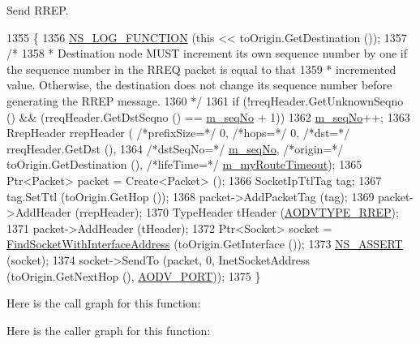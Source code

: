 Send R\+R\+EP. 


\begin{DoxyCode}
1355 \{
1356   \hyperlink{log-macros-disabled_8h_a90b90d5bad1f39cb1b64923ea94c0761}{NS\_LOG\_FUNCTION} (\textcolor{keyword}{this} << toOrigin.GetDestination ());
1357   \textcolor{comment}{/*}
1358 \textcolor{comment}{   * Destination node MUST increment its own sequence number by one if the sequence number in the RREQ
       packet is equal to that}
1359 \textcolor{comment}{   * incremented value. Otherwise, the destination does not change its sequence number before generating
       the  RREP message.}
1360 \textcolor{comment}{   */}
1361   \textcolor{keywordflow}{if} (!rreqHeader.GetUnknownSeqno () && (rreqHeader.GetDstSeqno () == \hyperlink{classns3_1_1aodv_1_1RoutingProtocol_abf5ef6b30d0ccf20b9b5ecf7918f67b2}{m\_seqNo} + 1))
1362     \hyperlink{classns3_1_1aodv_1_1RoutingProtocol_abf5ef6b30d0ccf20b9b5ecf7918f67b2}{m\_seqNo}++;
1363   RrepHeader rrepHeader ( \textcolor{comment}{/*prefixSize=*/} 0, \textcolor{comment}{/*hops=*/} 0, \textcolor{comment}{/*dst=*/} rreqHeader.GetDst (),
1364                                           \textcolor{comment}{/*dstSeqNo=*/} \hyperlink{classns3_1_1aodv_1_1RoutingProtocol_abf5ef6b30d0ccf20b9b5ecf7918f67b2}{m\_seqNo}, \textcolor{comment}{/*origin=*/} toOrigin.GetDestination
       (), \textcolor{comment}{/*lifeTime=*/} \hyperlink{classns3_1_1aodv_1_1RoutingProtocol_a7681a59458486d0b7a61937a9a90b0a1}{m\_myRouteTimeout});
1365   Ptr<Packet> packet = Create<Packet> ();
1366   SocketIpTtlTag tag;
1367   tag.SetTtl (toOrigin.GetHop ());
1368   packet->AddPacketTag (tag);
1369   packet->AddHeader (rrepHeader);
1370   TypeHeader tHeader (\hyperlink{namespacens3_1_1aodv_a8cf417608302ba0ed75225c976944d44a034af3d66c569436a630b5ee35399e45}{AODVTYPE\_RREP});
1371   packet->AddHeader (tHeader);
1372   Ptr<Socket> socket = \hyperlink{classns3_1_1aodv_1_1RoutingProtocol_a7cebc7baa398569f432ea2521310dffe}{FindSocketWithInterfaceAddress} (toOrigin.GetInterface 
      ());
1373   \hyperlink{assert_8h_a6dccdb0de9b252f60088ce281c49d052}{NS\_ASSERT} (socket);
1374   socket->SendTo (packet, 0, InetSocketAddress (toOrigin.GetNextHop (), 
      \hyperlink{classns3_1_1aodv_1_1RoutingProtocol_ac4a3de99b49ad5f6efc9b71a700f7ec4}{AODV\_PORT}));
1375 \}
\end{DoxyCode}


Here is the call graph for this function\+:




Here is the caller graph for this function\+:


